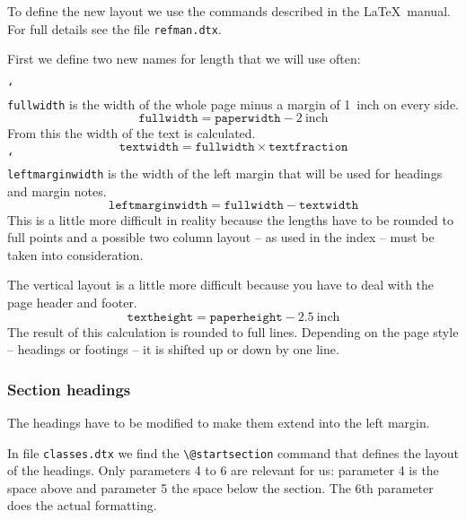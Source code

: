 \documentclass[twoside,a4paper]{refart}
\DeclareRobustCommand\cs[1]{\texttt{\char`\\#1}}
\begin{document}
To define the new layout we use the commands described in the \LaTeX\ 
manual. For full details see the file \texttt{refman.dtx}.


First we define two new names for length that we will use often:

\cs{fullwidth} is the width of the whole page minus a margin of 1~inch 
on every side. 
%
\begin{displaymath}
\texttt{fullwidth} = \texttt{paperwidth} - 2\ \textrm{inch}
\end{displaymath}
%
From this the width of the text is calculated.
%
\begin{displaymath}
\texttt{textwidth} = \texttt{fullwidth} \times \texttt{textfraction}
\end{displaymath}
%
\cs{leftmarginwidth} is the width of the left margin that will be 
used for headings and margin notes. 
\begin{displaymath}
\texttt{leftmarginwidth} = \texttt{fullwidth} - \texttt{textwidth}
\end{displaymath}
%
This is a little more difficult in reality because the lengths have to 
be rounded to full points and a possible two column layout -- as used 
in the index -- must be taken into consideration.

The vertical layout is a little more difficult because you have to 
deal with the page header and footer. 
%
\begin{displaymath}
\texttt{textheight} = \texttt{paperheight} - 2.5\ \textrm{inch}
\end{displaymath}
%
The result of this calculation is rounded to full lines. Depending on 
the page style -- headings or footings -- it is shifted up or down by one 
line.

\vspace{0pt plus 1cm}

\subsubsection{Section headings}

The headings have to be modified to make them extend into the left 
margin.

In file \texttt{classes.dtx} we find the \verb|\@startsection| command 
that defines the layout of the headings. Only parameters 4 to 6 are 
relevant for us: parameter 4 is the space above and parameter 5 the 
space below the section. The 6th parameter does the actual formatting.
\end{document}
